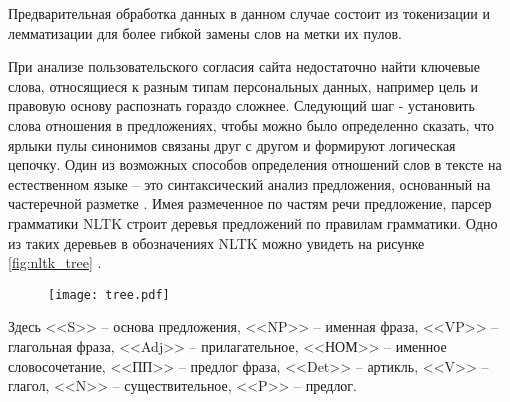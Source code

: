 \documentclass[../main]{subfiles}
\begin{document}
Предварительная обработка данных в данном случае состоит из токенизации и лемматизации для более гибкой замены слов на метки их пулов.

При анализе пользовательского согласия сайта недостаточно найти ключевые слова, относящиеся к разным типам персональных данных, например цель и правовую основу распознать гораздо сложнее. Следующий шаг - установить слова отношения в предложениях, чтобы можно было определенно сказать, что ярлыки пулы синонимов связаны друг с другом и формируют логическая цепочку. Один из возможных способов определения отношений слов в тексте на естественном языке -- это синтаксический анализ предложения, основанный на частеречной разметке \cite{POS}. Имея размеченное по частям речи предложение, парсер грамматики NLTK \cite{NLTK} строит деревья предложений по правилам грамматики. Одно из таких деревьев в обозначениях NLTK можно увидеть на рисунке \ref{fig:nltk_tree} \cite{NLTK}.

\begin{figure}[H]
    \centering
    {\texttt{[image: tree.pdf]}}
    \vspace{-\baselineskip}
\end{figure}

Здесь <<S>> -- основа предложения, <<NP>> -- именная фраза, <<VP>> -- глагольная фраза, <<Adj>> -- прилагательное, <<НОМ>> -- именное словосочетание, <<ПП>> -- предлог фраза, <<Det>> -- артикль, <<V>> -- глагол, <<N>> -- существительное, <<P>> -- предлог.
\end{document}
